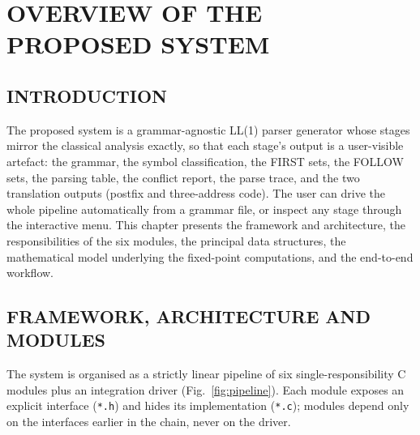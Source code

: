 \documentclass[12pt,a4paper,oneside,openany]{report}
\newcommand{\code}[1]{\texttt{#1}}
\begin{document}



\chapter{OVERVIEW OF THE PROPOSED SYSTEM}
\label{ch:proposed}

\section{INTRODUCTION}
The proposed system is a grammar-agnostic LL(1) parser generator whose
stages mirror the classical analysis exactly, so that each stage's output
is a user-visible artefact: the grammar, the symbol classification, the
FIRST sets, the FOLLOW sets, the parsing table, the conflict report, the
parse trace, and the two translation outputs (postfix and three-address
code). The user can drive the whole pipeline automatically from a grammar
file, or inspect any stage through the interactive menu. This chapter
presents the framework and architecture, the responsibilities of the six
modules, the principal data structures, the mathematical model underlying
the fixed-point computations, and the end-to-end workflow.

\section{FRAMEWORK, ARCHITECTURE AND MODULES}
The system is organised as a strictly linear pipeline of six
single-responsibility C modules plus an integration driver
(Fig.~\ref{fig:pipeline}). Each module exposes an explicit interface
(\code{*.h}) and hides its implementation (\code{*.c}); modules depend only
on the interfaces earlier in the chain, never on the driver.
\end{document}
